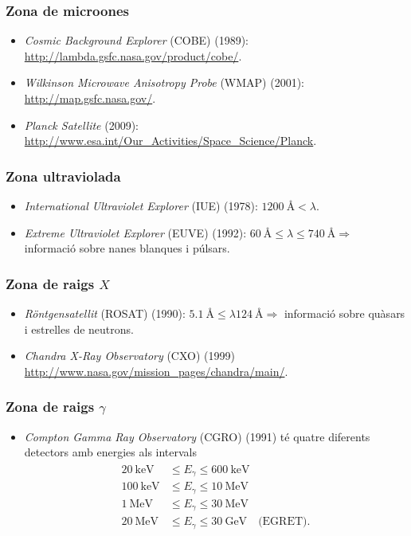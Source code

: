 \subsubsection*{Zona de microones}
\begin{itemize}
	\item \textit{Cosmic Background Explorer} (COBE) (1989): \url{http://lambda.gsfc.nasa.gov/product/cobe/}.
	\item \textit{Wilkinson Microwave Anisotropy Probe} (WMAP) (2001): \url{http://map.gsfc.nasa.gov/}.
	\item \textit{Planck Satellite} (2009): \url{http://www.esa.int/Our_Activities/Space_Science/Planck}.
\end{itemize}

\subsubsection*{Zona ultraviolada}
\begin{itemize}
	\item \textit{International Ultraviolet Explorer} (IUE) (1978): $\SI{1200}{\angstrom} < \lambda$.
	\item \textit{Extreme Ultraviolet Explorer} (EUVE) (1992): $\SI{60}{\angstrom} \leq \lambda \leq \SI{740}{\angstrom} \Rightarrow$ informació sobre nanes blanques i púlsars.
\end{itemize}

\subsubsection*{Zona de raigs $X$}
\begin{itemize}
	\item \textit{Röntgensatellit} (ROSAT) (1990): $\SI{5.1}{\angstrom} \leq \lambda \SI{124}{\angstrom} \Rightarrow$ informació sobre quàsars i estrelles de neutrons.
	\item \textit{Chandra X-Ray Observatory} (CXO) (1999) \url{http://www.nasa.gov/mission_pages/chandra/main/}.
\end{itemize}

\subsubsection*{Zona de raigs $\gamma$}
\begin{itemize}
	\item \textit{Compton Gamma Ray Observatory} (CGRO) (1991) té quatre diferents detectors amb energies als intervals
	\begin{align*}
	\begin{aligned}
		\SI{20}{\keV} &\leq E_{\gamma} \leq \SI{600}{\keV} \\
		\SI{100}{\keV} &\leq E_{\gamma} \leq \SI{10}{\MeV} \\
		\SI{1}{\MeV} &\leq E_{\gamma} \leq \SI{30}{\MeV} \\
		\SI{20}{\MeV} &\leq E_{\gamma} \leq \SI{30}{\GeV} \quad \text{(EGRET).} \\
	\end{aligned}
	\end{align*}
\end{itemize}

